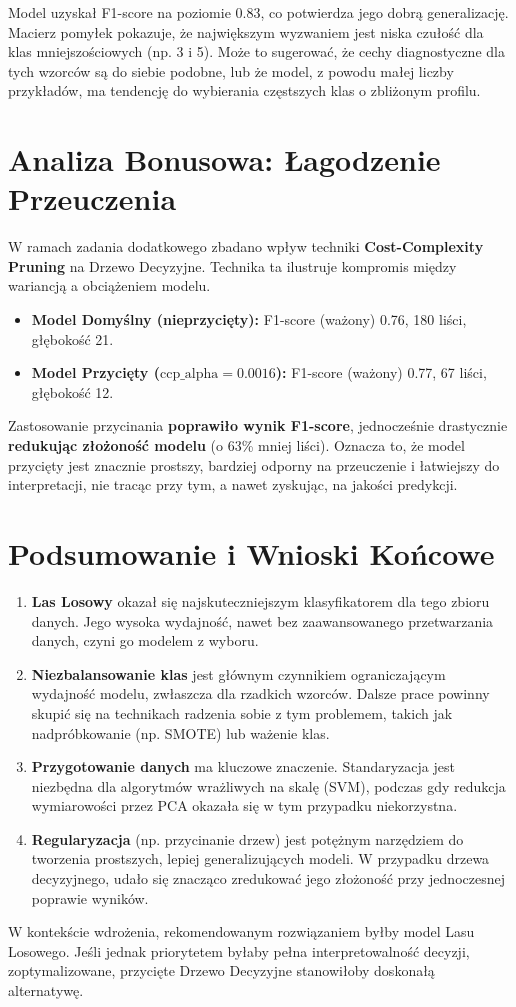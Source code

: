 \documentclass[12pt,a4paper]{article}
\begin{document}
Model uzyskał F1-score na poziomie 0.83, co potwierdza jego dobrą generalizację. Macierz pomyłek pokazuje, że największym wyzwaniem jest niska czułość dla klas mniejszościowych (np. 3 i 5). Może to sugerować, że cechy diagnostyczne dla tych wzorców są do siebie podobne, lub że model, z powodu małej liczby przykładów, ma tendencję do wybierania częstszych klas o zbliżonym profilu.

\clearpage

\section{Analiza Bonusowa: Łagodzenie Przeuczenia}
W ramach zadania dodatkowego zbadano wpływ techniki \textbf{Cost-Complexity Pruning} na Drzewo Decyzyjne. Technika ta ilustruje kompromis między wariancją a obciążeniem modelu.
\begin{itemize}
    \item \textbf{Model Domyślny (nieprzycięty):} F1-score (ważony) 0.76, 180 liści, głębokość 21.
    \item \textbf{Model Przycięty ($\text{ccp\_alpha}=0.0016$):} F1-score (ważony) 0.77, 67 liści, głębokość 12.
\end{itemize}
Zastosowanie przycinania \textbf{poprawiło wynik F1-score}, jednocześnie drastycznie \textbf{redukując złożoność modelu} (o 63\% mniej liści). Oznacza to, że model przycięty jest znacznie prostszy, bardziej odporny na przeuczenie i łatwiejszy do interpretacji, nie tracąc przy tym, a nawet zyskując, na jakości predykcji.

\section{Podsumowanie i Wnioski Końcowe}
\begin{enumerate}
    \item \textbf{Las Losowy} okazał się najskuteczniejszym klasyfikatorem dla tego zbioru danych. Jego wysoka wydajność, nawet bez zaawansowanego przetwarzania danych, czyni go modelem z wyboru.
    \item \textbf{Niezbalansowanie klas} jest głównym czynnikiem ograniczającym wydajność modelu, zwłaszcza dla rzadkich wzorców. Dalsze prace powinny skupić się na technikach radzenia sobie z tym problemem, takich jak nadpróbkowanie (np. SMOTE) lub ważenie klas.
    \item \textbf{Przygotowanie danych} ma kluczowe znaczenie. Standaryzacja jest niezbędna dla algorytmów wrażliwych na skalę (SVM), podczas gdy redukcja wymiarowości przez PCA okazała się w tym przypadku niekorzystna.
    \item \textbf{Regularyzacja} (np. przycinanie drzew) jest potężnym narzędziem do tworzenia prostszych, lepiej generalizujących modeli. W przypadku drzewa decyzyjnego, udało się znacząco zredukować jego złożoność przy jednoczesnej poprawie wyników.
\end{enumerate}
W kontekście wdrożenia, rekomendowanym rozwiązaniem byłby model Lasu Losowego. Jeśli jednak priorytetem byłaby pełna interpretowalność decyzji, zoptymalizowane, przycięte Drzewo Decyzyjne stanowiłoby doskonałą alternatywę.
\end{document}
